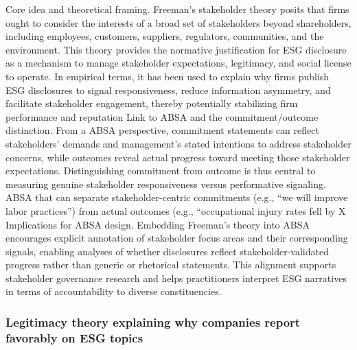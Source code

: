 Core idea and theoretical framing. Freeman’s stakeholder theory posits that firms ought to consider the interests of a broad set of stakeholders beyond shareholders, including employees, customers, suppliers, regulators, communities, and the environment. This theory provides the normative justification for ESG disclosure as a mechanism to manage stakeholder expectations, legitimacy, and social license to operate. In empirical terms, it has been used to explain why firms publish ESG disclosures to signal responsiveness, reduce information asymmetry, and facilitate stakeholder engagement, thereby potentially stabilizing firm performance and reputation \cite{10.3390/jrfm16100429,10.1002/csr.70116,10.1108/sampj-10-2020-0358,10.2139/ssrn.5130854}
Link to ABSA and the commitment/outcome distinction. From a ABSA perspective, commitment statements can reflect stakeholders’ demands and management’s stated intentions to address stakeholder concerns, while outcomes reveal actual progress toward meeting those stakeholder expectations. Distinguishing commitment from outcome is thus central to measuring genuine stakeholder responsiveness versus performative signaling. ABSA that can separate stakeholder-centric commitments (e.g., “we will improve labor practices”) from actual outcomes (e.g., “occupational injury rates fell by X%
Implications for ABSA design. Embedding Freeman’s theory into ABSA encourages explicit annotation of stakeholder focus areas and their corresponding signals, enabling analyses of whether disclosures reflect stakeholder-validated progress rather than generic or rhetorical statements. This alignment supports stakeholder governance research and helps practitioners interpret ESG narratives in terms of accountability to diverse constituencies.
\subsubsection{Legitimacy theory explaining why companies report favorably on ESG topics}

